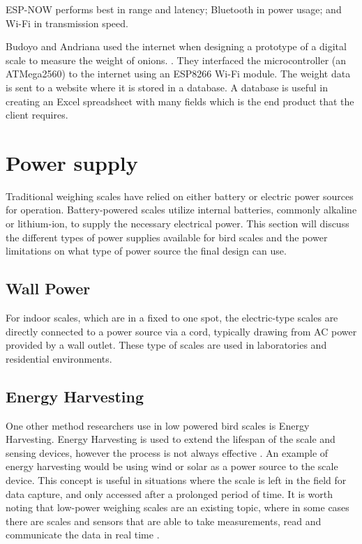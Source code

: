 \documentclass[class=report,11pt,crop=false]{standalone}
\begin{document}
ESP-NOW performs best in range and latency; Bluetooth in power usage; and Wi-Fi in transmission speed. 

Budoyo and Andriana used the internet when designing a prototype of a digital scale to measure the weight of onions. \cite{iot}. They interfaced the microcontroller (an  ATMega2560) to the internet using an ESP8266 Wi-Fi module. The weight data is sent to a website where it is stored in a database. A database is useful in creating an Excel spreadsheet with many fields which is the end product that the client requires.

\section{Power supply}	
Traditional weighing scales have relied on either battery or electric power sources for operation. Battery-powered scales utilize internal batteries, commonly alkaline or lithium-ion, to supply the necessary electrical power. This section will discuss the different types of power supplies available for bird scales and the power limitations on what type of power source the final design can use.

\subsection{Wall Power}
For indoor scales, which are in a fixed to one spot, the electric-type scales are directly connected to a power source via a cord, typically drawing from AC power provided by a wall outlet. These type of scales are used in laboratories and residential environments. 

\subsection{Energy Harvesting}
One other method researchers use in low powered bird scales is Energy Harvesting. Energy Harvesting is used to extend the lifespan of the scale and sensing devices, however the process is not always effective \cite{EnergyHarvesting}. An example of energy harvesting would be using wind or solar as a power source to the scale device. This concept is useful in situations where the scale is left in the field for data capture, and only accessed after a prolonged period of time. It is worth noting that low-power weighing scales are an existing topic, where in some cases there are scales and sensors that are able to take measurements, read and communicate the data in real time \cite{ImageBased}. 
\end{document}
